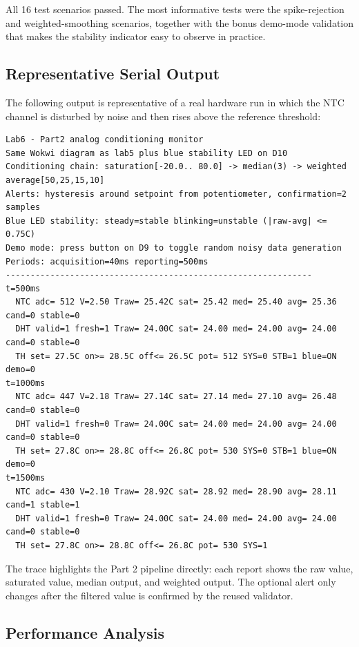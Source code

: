 \documentclass[12pt]{article}
\begin{document}
All 16 test scenarios passed. The most informative tests were the spike-rejection and weighted-smoothing scenarios, together with the bonus demo-mode validation that makes the stability indicator easy to observe in practice.

\subsection{Representative Serial Output}

The following output is representative of a real hardware run in which the NTC channel is disturbed by noise and then rises above the reference threshold:

\begin{verbatim}
Lab6 - Part2 analog conditioning monitor
Same Wokwi diagram as lab5 plus blue stability LED on D10
Conditioning chain: saturation[-20.0.. 80.0] -> median(3) -> weighted average[50,25,15,10]
Alerts: hysteresis around setpoint from potentiometer, confirmation=2 samples
Blue LED stability: steady=stable blinking=unstable (|raw-avg| <= 0.75C)
Demo mode: press button on D9 to toggle random noisy data generation
Periods: acquisition=40ms reporting=500ms
--------------------------------------------------------------
t=500ms
  NTC adc= 512 V=2.50 Traw= 25.42C sat= 25.42 med= 25.40 avg= 25.36 cand=0 stable=0
  DHT valid=1 fresh=1 Traw= 24.00C sat= 24.00 med= 24.00 avg= 24.00 cand=0 stable=0
  TH set= 27.5C on>= 28.5C off<= 26.5C pot= 512 SYS=0 STB=1 blue=ON demo=0
t=1000ms
  NTC adc= 447 V=2.18 Traw= 27.14C sat= 27.14 med= 27.10 avg= 26.48 cand=0 stable=0
  DHT valid=1 fresh=0 Traw= 24.00C sat= 24.00 med= 24.00 avg= 24.00 cand=0 stable=0
  TH set= 27.8C on>= 28.8C off<= 26.8C pot= 530 SYS=0 STB=1 blue=ON demo=0
t=1500ms
  NTC adc= 430 V=2.10 Traw= 28.92C sat= 28.92 med= 28.90 avg= 28.11 cand=1 stable=1
  DHT valid=1 fresh=0 Traw= 24.00C sat= 24.00 med= 24.00 avg= 24.00 cand=0 stable=0
  TH set= 27.8C on>= 28.8C off<= 26.8C pot= 530 SYS=1
\end{verbatim}

The trace highlights the Part 2 pipeline directly: each report shows the raw value, saturated value, median output, and weighted output. The optional alert only changes after the filtered value is confirmed by the reused validator.

\subsection{Performance Analysis}
\end{document}
